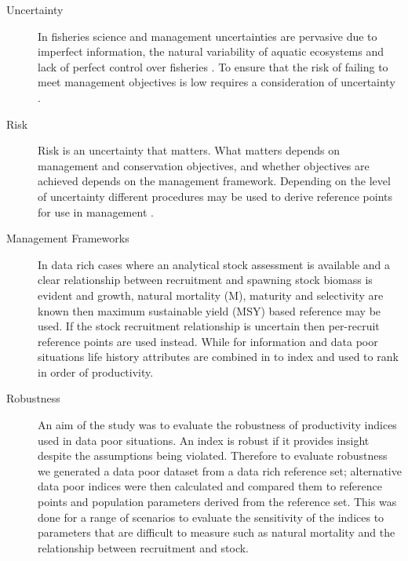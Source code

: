 \documentclass[12pt,doublespacing,a4paper]{ouparticle}
\begin{document}
\begin{description}

 \item[Uncertainty]
    In fisheries science and management uncertainties are pervasive due to imperfect information, the natural variability of aquatic ecosystems and lack of perfect control over fisheries \cite{peterman2004possible}. To ensure that the risk of failing to meet management objectives is low requires a consideration of uncertainty \citep{kell2015kobe}.
      
 \item[Risk] 
    Risk is an uncertainty that matters. What matters depends on management and conservation objectives, and whether objectives are achieved depends on the management framework.  Depending on the level of uncertainty different procedures may be used to derive reference points for use in management \citep{reuter2010managing}. %
    
 \item[Management Frameworks] 
    In data rich cases where an analytical stock assessment is available and a clear relationship between recruitment and spawning stock biomass is evident and growth, natural mortality (M), maturity and selectivity are known then maximum sustainable yield (MSY) based reference may be used. If the stock recruitment relationship is uncertain then per-recruit reference points are used instead. %
    While for information and data poor situations life history attributes are combined in to index and used to rank in order of productivity. 

 \item[Robustness]
    An aim of the study was to evaluate the robustness of productivity indices used in data poor situations. An index is robust if it provides insight despite the assumptions being violated. Therefore to evaluate robustness we generated a data poor dataset from a data rich reference set;  alternative data poor indices were then calculated and compared them to reference points and population parameters derived from the reference set. This was done for a range of scenarios to evaluate the sensitivity of the indices to parameters that are difficult to measure such as natural mortality and the relationship between recruitment and stock.
    

\end{description}
\end{document}
